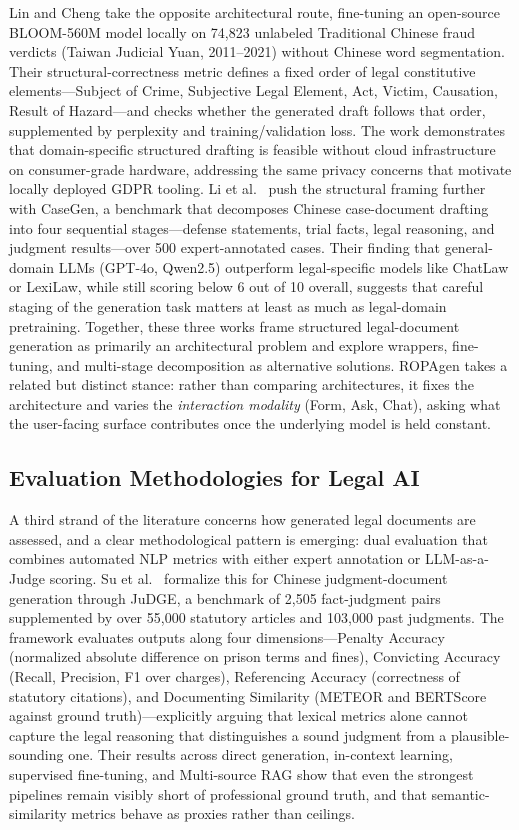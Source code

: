 Lin and Cheng \cite{linLegalDocumentsDrafting2024} take the opposite architectural route, fine-tuning an open-source BLOOM-560M model locally on 74,823 unlabeled Traditional Chinese fraud verdicts (Taiwan Judicial Yuan, 2011--2021) without Chinese word segmentation. Their structural-correctness metric defines a fixed order of legal constitutive elements---Subject of Crime, Subjective Legal Element, Act, Victim, Causation, Result of Hazard---and checks whether the generated draft follows that order, supplemented by perplexity and training/validation loss. The work demonstrates that domain-specific structured drafting is feasible without cloud infrastructure on consumer-grade hardware, addressing the same privacy concerns that motivate locally deployed GDPR tooling. Li et al.\ \cite{liCaseGenBenchmarkMultiStage2025} push the structural framing further with CaseGen, a benchmark that decomposes Chinese case-document drafting into four sequential stages---defense statements, trial facts, legal reasoning, and judgment results---over 500 expert-annotated cases. Their finding that general-domain LLMs (GPT-4o, Qwen2.5) outperform legal-specific models like ChatLaw or LexiLaw, while still scoring below 6 out of 10 overall, suggests that careful staging of the generation task matters at least as much as legal-domain pretraining. Together, these three works frame structured legal-document generation as primarily an architectural problem and explore wrappers, fine-tuning, and multi-stage decomposition as alternative solutions. ROPAgen takes a related but distinct stance: rather than comparing architectures, it fixes the architecture and varies the \emph{interaction modality} (Form, Ask, Chat), asking what the user-facing surface contributes once the underlying model is held constant.

\subsection{Evaluation Methodologies for Legal AI}

A third strand of the literature concerns how generated legal documents are assessed, and a clear methodological pattern is emerging: dual evaluation that combines automated NLP metrics with either expert annotation or LLM-as-a-Judge scoring. Su et al.\ \cite{suJuDGEBenchmarkingJudgment2025} formalize this for Chinese judgment-document generation through JuDGE, a benchmark of 2,505 fact-judgment pairs supplemented by over 55,000 statutory articles and 103,000 past judgments. The framework evaluates outputs along four dimensions---Penalty Accuracy (normalized absolute difference on prison terms and fines), Convicting Accuracy (Recall, Precision, F1 over charges), Referencing Accuracy (correctness of statutory citations), and Documenting Similarity (METEOR and BERTScore against ground truth)---explicitly arguing that lexical metrics alone cannot capture the legal reasoning that distinguishes a sound judgment from a plausible-sounding one. Their results across direct generation, in-context learning, supervised fine-tuning, and Multi-source RAG show that even the strongest pipelines remain visibly short of professional ground truth, and that semantic-similarity metrics behave as proxies rather than ceilings.

